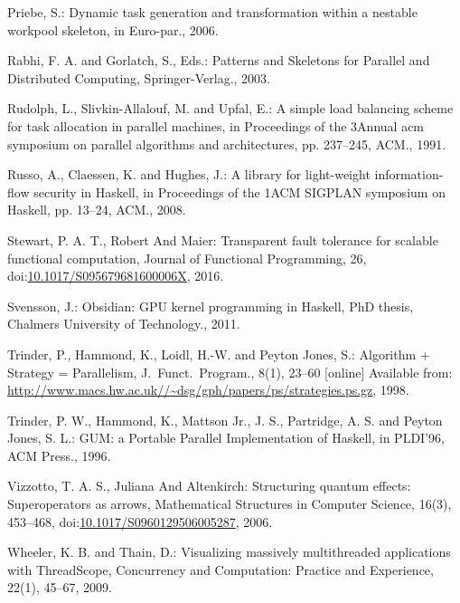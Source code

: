 \documentclass[paper=A4,twoside=true,openright,parskip=full,chapterprefix=true,headings=normal,bibliography=totoc,listof=totoc,titlepage=on,captions=tableabove,draft=false,british]{scrreprt}%
\begin{document}
\leavevmode\hypertarget{ref-WPEuropar06}{}%
Priebe, S.: Dynamic task generation and transformation within a nestable
workpool skeleton, in Euro-par., 2006.

\leavevmode\hypertarget{ref-SkeletonBook}{}%
Rabhi, F. A. and Gorlatch, S., Eds.: Patterns and Skeletons for Parallel
and Distributed Computing, Springer-Verlag., 2003.

\leavevmode\hypertarget{ref-Rudolph:1991:SLB:113379.113401}{}%
Rudolph, L., Slivkin-Allalouf, M. and Upfal, E.: A simple load balancing
scheme for task allocation in parallel machines, in Proceedings of the
3Annual acm symposium on parallel algorithms and architectures, pp.
237--245, ACM., 1991.

\leavevmode\hypertarget{ref-Russo:2008:LLI:1411286.1411289}{}%
Russo, A., Claessen, K. and Hughes, J.: A library for light-weight
information-flow security in Haskell, in Proceedings of the 1ACM SIGPLAN
symposium on Haskell, pp. 13--24, ACM., 2008.

\leavevmode\hypertarget{ref-stewart_maier_trinder_2016}{}%
Stewart, P. A. T., Robert And Maier: Transparent fault tolerance for
scalable functional computation, Journal of Functional Programming, 26,\\
doi:\href{https://doi.org/10.1017/S095679681600006X}{10.1017/S095679681600006X},
2016.

\leavevmode\hypertarget{ref-obsidian-phd}{}%
Svensson, J.: Obsidian: GPU kernel programming in Haskell, PhD thesis,
Chalmers University of Technology., 2011.

\leavevmode\hypertarget{ref-Trinder1998a}{}%
Trinder, P., Hammond, K., Loidl, H.-W. and Peyton Jones, S.: Algorithm +
Strategy = Parallelism, J.~Funct.~Program., 8(1), 23--60 {[}online{]}
Available from:
\url{http://www.macs.hw.ac.uk//~dsg/gph/papers/ps/strategies.ps.gz},
1998.

\leavevmode\hypertarget{ref-Trinder1996}{}%
Trinder, P. W., Hammond, K., Mattson Jr., J. S., Partridge, A. S. and
Peyton Jones, S. L.: GUM: a Portable Parallel Implementation of Haskell,
in PLDI'96, ACM Press., 1996.

\leavevmode\hypertarget{ref-vizzotto_altenkirch_sabry_2006}{}%
Vizzotto, T. A. S., Juliana And Altenkirch: Structuring quantum effects:
Superoperators as arrows, Mathematical Structures in Computer Science,
16(3), 453--468,
doi:\href{https://doi.org/10.1017/S0960129506005287}{10.1017/S0960129506005287},
2006.

\leavevmode\hypertarget{ref-Wheeler2009}{}%
Wheeler, K. B. and Thain, D.: Visualizing massively multithreaded
applications with ThreadScope, Concurrency and Computation: Practice and
Experience, 22(1), 45--67, 2009.
\end{document}
